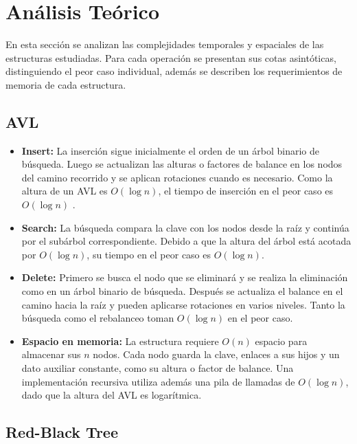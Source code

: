 \documentclass[11pt,letterpaper]{article}
\begin{document}
\newpage

\section{Análisis Teórico}

En esta sección se analizan las complejidades temporales y espaciales de las estructuras estudiadas. Para cada operación se presentan sus cotas asintóticas, distinguiendo el peor caso individual, además se describen los requerimientos de memoria de cada estructura.

\subsection{AVL}

\begin{itemize}
    \item \textbf{Insert:} La inserción sigue inicialmente el orden de un árbol
    binario de búsqueda. Luego se actualizan las alturas o factores de balance
    en los nodos del camino recorrido y se aplican rotaciones cuando es
    necesario. Como la altura de un AVL es $O(\log n)$, el tiempo de inserción
    en el peor caso es $O(\log n)$ .

    \item \textbf{Search:} La búsqueda compara la clave con los nodos desde la
    raíz y continúa por el subárbol correspondiente. Debido a que la altura del
    árbol está acotada por $O(\log n)$, su tiempo en el peor caso es
    $O(\log n)$.

    \item \textbf{Delete:} Primero se busca el nodo que se eliminará y se
    realiza la eliminación como en un árbol binario de búsqueda. Después se
    actualiza el balance en el camino hacia la raíz y pueden aplicarse
    rotaciones en varios niveles. Tanto la búsqueda como el rebalanceo toman
    $O(\log n)$ en el peor caso.

    \item \textbf{Espacio en memoria:} La estructura requiere $O(n)$ espacio
    para almacenar sus $n$ nodos. Cada nodo guarda la clave, enlaces a sus hijos
    y un dato auxiliar constante, como su altura o factor de balance. Una
    implementación recursiva utiliza además una pila de llamadas de
    $O(\log n)$, dado que la altura del AVL es logarítmica.
\end{itemize}

\subsection{Red-Black Tree}
\end{document}
